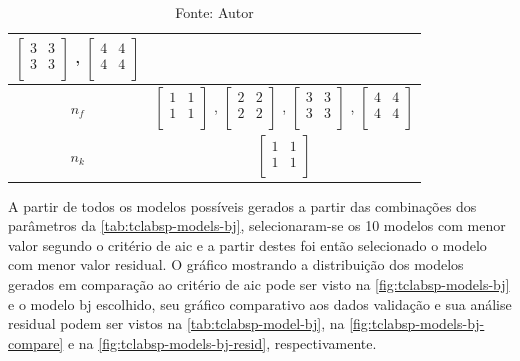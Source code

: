 \begin{table}[h]
\begin{tabular}{c|c}
							$ \begin{bmatrix}	3	&	3	\\	3	&	3	\\	\end{bmatrix} $	,		
							$ \begin{bmatrix}	4	&	4	\\	4	&	4	\\	\end{bmatrix} $		\\ \midrule
		$n_f$			&
							$ \begin{bmatrix}	1	&	1	\\	1	&	1	\\	\end{bmatrix} $	,		
							$ \begin{bmatrix}	2	&	2	\\	2	&	2	\\	\end{bmatrix} $	,		
							$ \begin{bmatrix}	3	&	3	\\	3	&	3	\\	\end{bmatrix} $	,		
							$ \begin{bmatrix}	4	&	4	\\	4	&	4	\\	\end{bmatrix} $		\\ \midrule
		$n_k$			&
							$ \begin{bmatrix}	1	&	1	\\	1	&	1	\\	\end{bmatrix} $		\\ \bottomrule
	\end{tabular}
	\caption*{Fonte: Autor}
\end{table}

A partir de todos os modelos possíveis gerados a partir das combinações dos parâmetros da \cref{tab:tclabsp-models-bj},
selecionaram-se os 10 modelos com menor valor segundo o critério de \acrshort{aic} e a partir destes foi então
selecionado o modelo com menor valor residual.
O gráfico mostrando a distribuição dos modelos gerados em comparação ao critério de \acrshort{aic} pode ser
visto na \cref{fig:tclabsp-models-bj} e o modelo \acrshort{bj} escolhido, seu gráfico comparativo aos dados validação
e sua análise residual podem ser vistos na \cref{tab:tclabsp-model-bj}, na \cref{fig:tclabsp-models-bj-compare} e na
\cref{fig:tclabsp-models-bj-resid}, respectivamente.

